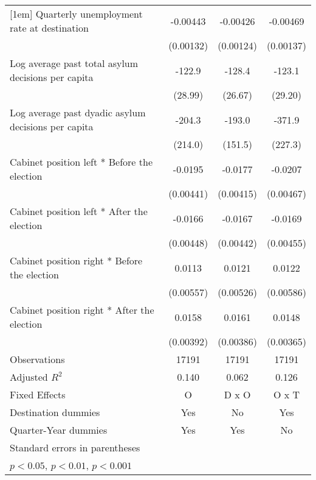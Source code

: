 \begin{table}[htbp]
\begin{tabular}{l*{3}{c}}
[1em]
Quarterly unemployment rate at destination&    -0.00443\sym{**} &    -0.00426\sym{**} &    -0.00469\sym{**} \\
                    &   (0.00132)         &   (0.00124)         &   (0.00137)         \\
[1em]
Log average past total asylum decisions per capita&      -122.9\sym{***}&      -128.4\sym{***}&      -123.1\sym{***}\\
                    &     (28.99)         &     (26.67)         &     (29.20)         \\
[1em]
Log average past dyadic asylum decisions per capita&      -204.3         &      -193.0         &      -371.9         \\
                    &     (214.0)         &     (151.5)         &     (227.3)         \\
[1em]
Cabinet position left * Before the election&     -0.0195\sym{***}&     -0.0177\sym{***}&     -0.0207\sym{***}\\
                    &   (0.00441)         &   (0.00415)         &   (0.00467)         \\
[1em]
Cabinet position left * After the election&     -0.0166\sym{***}&     -0.0167\sym{***}&     -0.0169\sym{***}\\
                    &   (0.00448)         &   (0.00442)         &   (0.00455)         \\
[1em]
Cabinet position right * Before the election&      0.0113\sym{*}  &      0.0121\sym{*}  &      0.0122\sym{*}  \\
                    &   (0.00557)         &   (0.00526)         &   (0.00586)         \\
[1em]
Cabinet position right * After the election&      0.0158\sym{***}&      0.0161\sym{***}&      0.0148\sym{***}\\
                    &   (0.00392)         &   (0.00386)         &   (0.00365)         \\
\hline
Observations        &       17191         &       17191         &       17191         \\
Adjusted \(R^{2}\)  &       0.140         &       0.062         &       0.126         \\
Fixed Effects       &           O         &       D x O         &       O x T         \\
Destination dummies &         Yes         &          No         &         Yes         \\
Quarter-Year dummies&         Yes         &         Yes         &          No         \\
\hline\hline
\multicolumn{4}{l}{\footnotesize Standard errors in parentheses}\\
\multicolumn{4}{l}{\footnotesize \sym{*} \(p<0.05\), \sym{**} \(p<0.01\), \sym{***} \(p<0.001\)}\\
\end{tabular}
\end{table}
